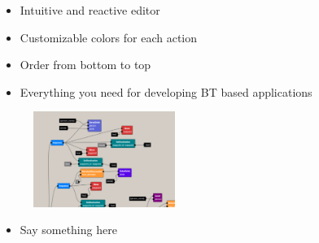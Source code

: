 \documentclass[notes,slidesec,a4]{seminar}
\begin{document}
\begin{hslide}
\newpage
{}
\begin{minipage}[t]{6.5cm}
  \vspace{0.5cm}
\begin{itemize}
\item Intuitive and reactive editor
\item Customizable colors for each action
\item Order from bottom to top
\item Everything you need for developing BT based applications
\end{itemize}
\end{minipage}
\begin{minipage}[t]{4.5cm}
	\begin{figure}
		\hspace{0.5cm}
		\includegraphics[width=4.6cm]{figs/screenshot2.png}
	\end{figure}
\end{minipage}

\end{hslide}

\begin{hslide}
\begin{minipage}[t]{6.5cm}
  \begin{itemize}
  \item Say something here
\end{itemize}
\end{minipage}

\end{hslide}
\end{document}

